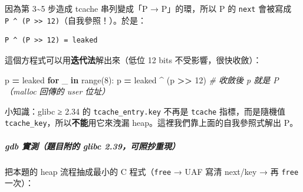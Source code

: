 \documentclass[10pt,a4paper]{article}
\newenvironment{Shaded}{\begin{snugshade}}{\end{snugshade}}
\newcommand{\BuiltInTok}[1]{#1}
\newcommand{\CommentTok}[1]{\textcolor[rgb]{0.56,0.35,0.01}{\textit{#1}}}
\newcommand{\ControlFlowTok}[1]{\textcolor[rgb]{0.13,0.29,0.53}{\textbf{#1}}}
\newcommand{\DecValTok}[1]{\textcolor[rgb]{0.00,0.00,0.81}{#1}}
\newcommand{\KeywordTok}[1]{\textcolor[rgb]{0.13,0.29,0.53}{\textbf{#1}}}
\newcommand{\NormalTok}[1]{#1}
\newcommand{\OperatorTok}[1]{\textcolor[rgb]{0.81,0.36,0.00}{\textbf{#1}}}
\renewenvironment{Shaded}{%
  \def\FrameCommand{\fboxsep=3.2pt\colorbox{shadecolor}}%
  \MakeFramed{\advance\hsize-\width\FrameRestore\small}%
}{%
  \endMakeFramed
}
\renewenvironment{quote}{%
  \begin{mdframed}[linewidth=0pt,innerleftmargin=0pt,innerrightmargin=0pt,
    innerbottommargin=0pt,innertopmargin=0pt,skipabove=0.55em,skipbelow=0.55em,
    leftmargin=0.9em,rightmargin=0.4em,startcode={\color{quotebar}\vrule width 2.6pt},%
    endcode={}]%
  \itshape\color{black}%
}{%
  \end{mdframed}%
}
\begin{document}
因為第 3\textasciitilde5 步造成 tcache 串列變成「P → P」的環，所以 P 的
\texttt{next} 會被寫成
\texttt{P\ \allowbreak{}\^\allowbreak{}{}\allowbreak{}\ \allowbreak{}(P\ \allowbreak{}\textgreater{}\allowbreak{}\textgreater{}\allowbreak{}\ \allowbreak{}12)}（自我參照！）。於是：

\begin{Verbatim}[breaklines=true,breakanywhere=true,breakautoindent=false,fontsize=\fontsize{7.0}{9.5}\selectfont]
P ^ (P >> 12) = leaked
\end{Verbatim}

這個方程式可以用\textbf{迭代法}解出來（低位 12 bits
不受影響，很快收斂）：

\begin{Shaded}
\begin{Highlighting}[]
\NormalTok{p }\OperatorTok{=}\NormalTok{ leaked}
\ControlFlowTok{for}\NormalTok{ \_ }\KeywordTok{in} \BuiltInTok{range}\NormalTok{(}\DecValTok{8}\NormalTok{):}
\NormalTok{    p }\OperatorTok{=}\NormalTok{ leaked }\OperatorTok{\^{}}\NormalTok{ (p }\OperatorTok{\textgreater{}\textgreater{}} \DecValTok{12}\NormalTok{)      }\CommentTok{\# 收斂後 p 就是 P（malloc 回傳的 user 位址）}
\end{Highlighting}
\end{Shaded}

\begin{quote}
小知識：glibc ≥ 2.34 的 \texttt{tcache\_\allowbreak{}entry.\allowbreak{}key} 不再是
\texttt{tcache} 指標，而是隨機值
\texttt{tcache\_\allowbreak{}key}，所以\textbf{不能}用它來洩漏
heap。這裡我們靠上面的自我參照式解出 P。
\end{quote}

\subparagraph{gdb 實測（題目附的 glibc
2.39，可照抄重現）}\label{gdb-ux5be6ux6e2cux984cux76eeux9644ux7684-glibc-2.39ux53efux7167ux6284ux91cdux73fe}

把本題的 heap 流程抽成最小的 C 程式（\texttt{free} → UAF 寫清 next/key →
再 \texttt{free} 一次）：
\end{document}
